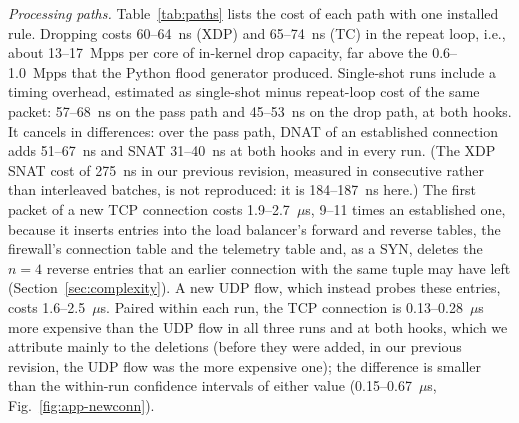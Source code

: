 \documentclass[conference]{IEEEtran}
\begin{document}
\textit{Processing paths.} Table~\ref{tab:paths} lists the cost of each path
with one installed rule. Dropping costs 60--64~ns (XDP) and 65--74~ns (TC) in
the repeat loop, i.e., about 13--17~Mpps per core of in-kernel drop
capacity, far above the 0.6--1.0~Mpps that the Python flood generator
produced. Single-shot runs include a timing overhead, estimated as
single-shot minus repeat-loop cost of the same packet: 57--68~ns on the pass
path and 45--53~ns on the drop path, at both hooks. It cancels in
differences: over the pass path, DNAT of an established connection adds
51--67~ns and SNAT 31--40~ns at both hooks and in every run. (The XDP SNAT
cost of 275~ns in our previous revision, measured in consecutive rather than
interleaved batches, is not reproduced: it is 184--187~ns here.) The first
packet of a new TCP connection costs 1.9--2.7~$\mu$s, 9--11 times an
established one, because it inserts entries into the load balancer's forward
and reverse tables, the firewall's connection table and the telemetry table
and, as a SYN, deletes the $n=4$ reverse entries that an earlier connection
with the same tuple may have left (Section~\ref{sec:complexity}). A new UDP
flow, which instead probes these entries, costs 1.6--2.5~$\mu$s. Paired
within each run, the TCP connection is 0.13--0.28~$\mu$s more expensive than
the UDP flow in all three runs and at both hooks, which we attribute mainly
to the deletions (before they were added, in our previous revision, the UDP
flow was the more expensive one); the difference is smaller than the
within-run confidence intervals of either value (0.15--0.67~$\mu$s,
Fig.~\ref{fig:app-newconn}).
\end{document}
